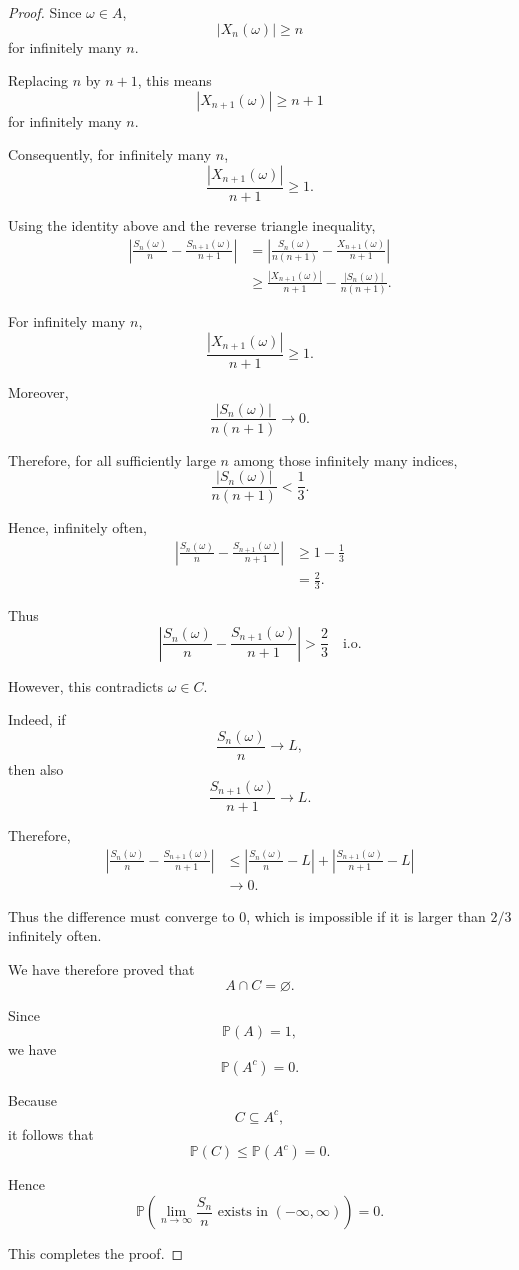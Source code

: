 \begin{proof}
Since $\omega\in A$,
\[
    |X_n(\omega)|\geq n
\]
for infinitely many $n$.

Replacing $n$ by $n+1$, this means
\[
    |X_{n+1}(\omega)|\geq n+1
\]
for infinitely many $n$.

Consequently, for infinitely many $n$,
\[
    \frac{|X_{n+1}(\omega)|}{n+1}\geq1.
\]

Using the identity above and the reverse triangle inequality,
\[
\begin{aligned}
\left|
    \frac{S_n(\omega)}{n}
    -
    \frac{S_{n+1}(\omega)}{n+1}
\right|
&=
\left|
    \frac{S_n(\omega)}{n(n+1)}
    -
    \frac{X_{n+1}(\omega)}{n+1}
\right|
\\
&\geq
\frac{|X_{n+1}(\omega)|}{n+1}
-
\frac{|S_n(\omega)|}{n(n+1)}.
\end{aligned}
\]

For infinitely many $n$,
\[
    \frac{|X_{n+1}(\omega)|}{n+1}\geq1.
\]

Moreover,
\[
    \frac{|S_n(\omega)|}{n(n+1)}
    \longrightarrow0.
\]

Therefore, for all sufficiently large $n$ among those infinitely many
indices,
\[
    \frac{|S_n(\omega)|}{n(n+1)}
    <\frac13.
\]

Hence, infinitely often,
\[
\begin{aligned}
\left|
    \frac{S_n(\omega)}{n}
    -
    \frac{S_{n+1}(\omega)}{n+1}
\right|
&\geq
1-\frac13
\\
&=\frac23.
\end{aligned}
\]

Thus
\[
    \boxed{
    \left|
    \frac{S_n(\omega)}{n}
    -
    \frac{S_{n+1}(\omega)}{n+1}
    \right|
    >\frac23
    \quad\text{i.o.}
    }
\]

However, this contradicts $\omega\in C$.

Indeed, if
\[
    \frac{S_n(\omega)}{n}\longrightarrow L,
\]
then also
\[
    \frac{S_{n+1}(\omega)}{n+1}\longrightarrow L.
\]

Therefore,
\[
\begin{aligned}
\left|
    \frac{S_n(\omega)}{n}
    -
    \frac{S_{n+1}(\omega)}{n+1}
\right|
&\leq
\left|
    \frac{S_n(\omega)}{n}-L
\right|
+
\left|
    \frac{S_{n+1}(\omega)}{n+1}-L
\right|
\\
&\longrightarrow0.
\end{aligned}
\]

Thus the difference must converge to $0$, which is impossible if it is
larger than $2/3$ infinitely often.

We have therefore proved that
\[
    A\cap C=\varnothing.
\]

Since
\[
    \mathbb{P}(A)=1,
\]
we have
\[
    \mathbb{P}(A^c)=0.
\]

Because
\[
    C\subseteq A^c,
\]
it follows that
\[
    \mathbb{P}(C)
    \leq
    \mathbb{P}(A^c)
    =0.
\]

Hence
\[
    \boxed{
    \mathbb{P}\left(
        \lim_{n\to\infty}\frac{S_n}{n}
        \text{ exists in }(-\infty,\infty)
    \right)=0.
    }
\]

This completes the proof.

\end{proof}


